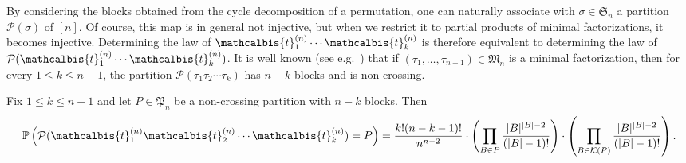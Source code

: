 \documentclass[10pt]{amsart}
\theoremstyle{definition}\newtheorem{defi}[theo]{Definition}\newtheorem{rema}[theo]{Remark}\newtheorem{exam}[theo]{Example}\newtheorem{exem}[theo]{Example}\newtheorem{nota}[theo]{Notation}
\def\PPP{\mathcal P}
\def\tb{\mathcalbis{t}}
\renewcommand\Pr[1]{\mathbb{P}\left(#1\right)}
\begin{document}
By considering the blocks obtained from the cycle decomposition of a permutation,
one can naturally associate with $\sigma \in \mathfrak{S}_{n}$ a partition $\PPP(\sigma)$ of $[n]$.
Of course, this map is in general  not injective, but when we restrict it to partial products of minimal factorizations,
it becomes injective. Determining the law of $\tb_{1}^{(n)} \cdots \tb_k^{(n)}$ is therefore equivalent to determining
the law of $\PPP(\tb_{1}^{(n)} \cdots \tb_{k}^{(n)})$.
It is well known (see e.g.\ \cite[Theorem 1]{Biane1997}) that if $(\tau_{1}, \ldots, \tau_{n-1})  \in \mathfrak{M}_{n}$ is a minimal factorization, then for every $1 \leq k \leq n-1$,
the partition $\PPP(\tau_{1} \tau_{2} \cdots \tau_{k})$
has $n-k$ blocks and is non-crossing.

\begin{proposition}
\label{prop:lawproduct}Fix $1 \leq k \leq n-1$ and let $P \in \mathfrak{P}_{n}$ be a non-crossing partition with $n-k$ blocks. Then
\[\Pr{\PPP(\tb_{1}^{(n)} \tb_{2}^{(n)} \cdots \tb_{k}^{(n)})=P}= \frac{k! (n-k-1)!}{n^{n-2}}  \cdot  \left( \prod_{B \in P} \frac{|B|^{|B|-2}}{(|B|-1)!} \right) \cdot \left(  \prod_{B \in  \mathcal{K}(P)} \frac{|B|^{|B|-2}}{(|B|-1)!} \right).\]
\end{proposition}
\end{document}
